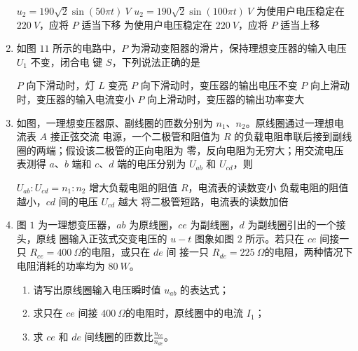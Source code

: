 \begin{enumerate}
\fourchoices
{$u_{2}=190 \sqrt{2} \sin (50 \pi t) \ V$}
{$u_{2}=190 \sqrt{2} \sin (100 \pi t) \ V$}
{为使用户电压稳定在 $ 220 \ V $，应将 $ P $ 适当下移}
{为使用户电压稳定在 $ 220 \ V $，应将 $ P $ 适当上移}


\item 
{}
如图 $ 11 $ 所示的电路中，$ P $ 为滑动变阻器的滑片，保持理想变压器的输入电压 $ U_{1} $ 不变，闭合电
键 $ S $，下列说法正确的是  
\begin{figure}[h!]
\centering

\end{figure}

\fourchoices
{$ P $ 向下滑动时，灯 $ L $ 变亮}
{$ P $ 向下滑动时，变压器的输出电压不变}
{$ P $ 向上滑动时，变压器的输入电流变小}
{$ P $ 向上滑动时，变压器的输出功率变大}



\item 
{}
如图，一理想变压器原、副线圈的匝数分别为 $ n_{1} $、$ n_{2} $。原线圈通过一理想电流表 $ A $ 接正弦交流
电源，一个二极管和阻值为 $ R $ 的负载电阻串联后接到副线圈的两端；假设该二极管的正向电阻为
零，反向电阻为无穷大；用交流电压表测得 $ a $、$ b $ 端和 $ c $、$ d $ 端的电压分别为 $ U_{ab} $ 和 $ U_{cd} $，则  
\begin{figure}[h!]
\centering

\end{figure}

\fourchoices
{$ U_{ab} : U_{cd} = n_{1} : n_{2} $}
{增大负载电阻的阻值 $ R $，电流表的读数变小}
{负载电阻的阻值越小，$ cd $ 间的电压 $ U_{cd} $ 越大}
{将二极管短路，电流表的读数加倍}



\item
{}
图 $ 1 $ 为一理想变压器，$ ab $ 为原线圈，$ ce $ 为副线圈，$ d $ 为副线圈引出的一个接头，原线
圈输入正弦式交变电压的 $ u-t $ 图象如图 $ 2 $ 所示。若只在 $ ce $ 间接一只 $ R_{ce}=400 \ \Omega $的电阻，或只在 $ de $ 间
接一只 $ R_{de}=225 \ \Omega $的电阻，两种情况下电阻消耗的功率均为 $ 80 \ W $。
\begin{enumerate}
\item
请写出原线圈输入电压瞬时值 $ u_{ab} $ 的表达式；
\item 
求只在 $ ce $ 间接 $ 400 \ \Omega $的电阻时，原线圈中的电流
$ I_{1} $；
\item 
求 $ ce $ 和 $ de $ 间线圈的匝数比$\frac{n_{c e}}{n_{d e}}$。



\end{enumerate}
\end{enumerate}

